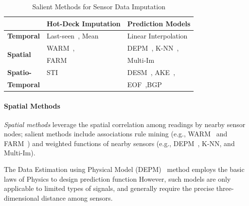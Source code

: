 
\begin{table}
\caption{Salient Methods for Sensor Data Imputation}
\label{tbl:methods}
\centering
{\small
\begin{tabular}{|l|l|l|} \hline
   &{\bf Hot-Deck Imputation}&{\bf Prediction Models}\\ \hline
{\bf Temporal} & Last-seen~\cite{Granger:lastseen}, Mean& Linear Interpolation\\ \hline
\multirow{2}{*}{\bf Spatial}& WARM~\cite{le2005estimating},& DEPM~\cite{li2008data}, K-NN~\cite{pan2010k},\\ 
&FARM~\cite{Gruenwald:FARM}&Multi-Im~\cite{yuan2000multiple}\\\hline
{\bf Spatio-}&STI~\cite{Jian-Zhong:STI}&DESM~\cite{li2008data}, AKE~\cite{pan2010k},\\
{\bf Temporal}&&EOF~\cite{beckers2003eof},BGP~\cite{Osborne2011}\\%
 \hline \end{tabular}
}
\vspace{-0.1in}
\end{table}

\paragraph{Spatial Methods}
{\em Spatial methods} leverage the spatial correlation among readings
by nearby sensor nodes; salient methods include associations rule
mining (e.g., WARM~\cite{le2005estimating} and
FARM~\cite{Gruenwald:FARM}) 
and weighted functions of nearby sensors (e.g., DEPM~\cite{li2008data},
K-NN\cite{pan2010k}, and Multi-Im\cite{yuan2000multiple}).

The Data Estimation using Physical Model (DEPM)~\cite{li2008data} method employs the basic laws of Physics to 
design prediction function %
However, such models are only applicable to limited types of signals, and generally require the precise three-dimensional distance among sensors.

